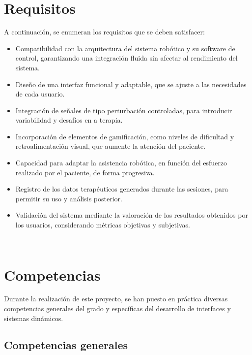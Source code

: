 \section{Requisitos}
\label{sec:requisitos}

A continuación, se enumeran los requisitos que se deben satisfacer:

\begin{itemize}
    \item Compatibilidad con la arquitectura del sistema robótico y su software de control, garantizando una integración fluida sin afectar al rendimiento del sistema.
    \item Diseño de una interfaz funcional y adaptable, que se ajuste a las necesidades de cada usuario.
    \item Integración de señales de tipo perturbación controladas, para introducir variabilidad y desafíos en a terapia.
    \item Incorporación de elementos de gamificación, como niveles de dificultad y retroalimentación visual, que aumente la atención del paciente.
    \item Capacidad para adaptar la asistencia robótica, en función del esfuerzo realizado por el paciente, de forma progresiva.
    \item Registro de los datos terapéuticos generados durante las sesiones, para permitir su uso y análisis posterior.
    \item Validación del sistema mediante la valoración de los resultados obtenidos por los usuarios, considerando métricas objetivas y subjetivas.
\end{itemize}\

\section{Competencias}
\label{sec:competencias}

Durante la realización de este proyecto, se han puesto en práctica diversas competencias generales del grado y específicas del desarrollo de interfaces y sistemas dinámicos.

\subsection{Competencias generales}
\label{sec:competencias}

